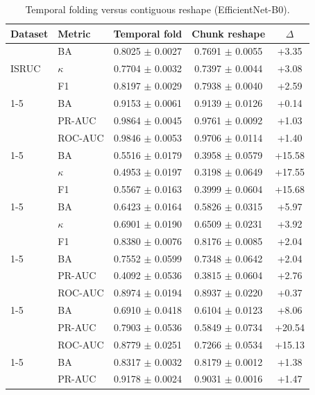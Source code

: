 \begin{table}[tbp]\centering\scriptsize\caption{Temporal folding versus contiguous reshape (EfficientNet-B0).}\begin{tabular}{@{}l l c c c@{}}\toprule Dataset & Metric & Temporal fold & Chunk reshape & $\Delta$ \\ \midrule
\multirow{3}{*}{ISRUC} & BA & 0.8025 $\pm$ 0.0027 & 0.7691 $\pm$ 0.0055 & +3.35 \\
 & $\kappa$ & 0.7704 $\pm$ 0.0032 & 0.7397 $\pm$ 0.0044 & +3.08 \\
 & F1 & 0.8197 $\pm$ 0.0029 & 0.7938 $\pm$ 0.0040 & +2.59 \\
\cmidrule(lr){1-5}
\multirow{3}{*}{Mumtaz2016} & BA & 0.9153 $\pm$ 0.0061 & 0.9139 $\pm$ 0.0126 & +0.14 \\
 & PR-AUC & 0.9864 $\pm$ 0.0045 & 0.9761 $\pm$ 0.0092 & +1.03 \\
 & ROC-AUC & 0.9846 $\pm$ 0.0053 & 0.9706 $\pm$ 0.0114 & +1.40 \\
\cmidrule(lr){1-5}
\multirow{3}{*}{FACED} & BA & 0.5516 $\pm$ 0.0179 & 0.3958 $\pm$ 0.0579 & +15.58 \\
 & $\kappa$ & 0.4953 $\pm$ 0.0197 & 0.3198 $\pm$ 0.0649 & +17.55 \\
 & F1 & 0.5567 $\pm$ 0.0163 & 0.3999 $\pm$ 0.0604 & +15.68 \\
\cmidrule(lr){1-5}
\multirow{3}{*}{TUEV} & BA & 0.6423 $\pm$ 0.0164 & 0.5826 $\pm$ 0.0315 & +5.97 \\
 & $\kappa$ & 0.6901 $\pm$ 0.0190 & 0.6509 $\pm$ 0.0231 & +3.92 \\
 & F1 & 0.8380 $\pm$ 0.0076 & 0.8176 $\pm$ 0.0085 & +2.04 \\
\cmidrule(lr){1-5}
\multirow{3}{*}{CHB-MIT} & BA & 0.7552 $\pm$ 0.0599 & 0.7348 $\pm$ 0.0642 & +2.04 \\
 & PR-AUC & 0.4092 $\pm$ 0.0536 & 0.3815 $\pm$ 0.0604 & +2.76 \\
 & ROC-AUC & 0.8974 $\pm$ 0.0194 & 0.8937 $\pm$ 0.0220 & +0.37 \\
\cmidrule(lr){1-5}
\multirow{3}{*}{MentalArithmetic} & BA & 0.6910 $\pm$ 0.0418 & 0.6104 $\pm$ 0.0123 & +8.06 \\
 & PR-AUC & 0.7903 $\pm$ 0.0536 & 0.5849 $\pm$ 0.0734 & +20.54 \\
 & ROC-AUC & 0.8779 $\pm$ 0.0251 & 0.7266 $\pm$ 0.0534 & +15.13 \\
\cmidrule(lr){1-5}
\multirow{3}{*}{TUAB} & BA & 0.8317 $\pm$ 0.0032 & 0.8179 $\pm$ 0.0012 & +1.38 \\
 & PR-AUC & 0.9178 $\pm$ 0.0024 & 0.9031 $\pm$ 0.0016 & +1.47 \\

\end{tabular}
\end{table}
